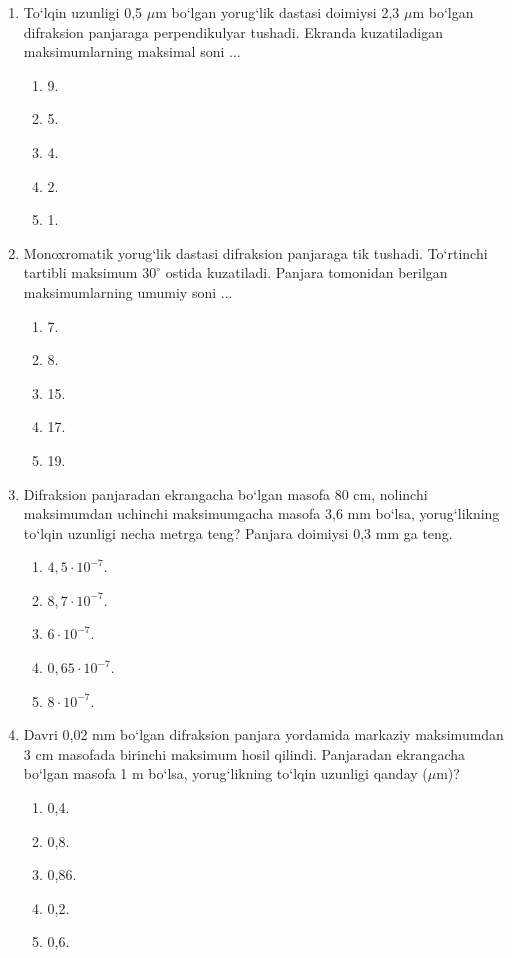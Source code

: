 \begin{enumerate}
\item To‘lqin uzunligi 0,5 $\mu$m bo‘lgan yorug‘lik dastasi doimiysi 2,3 $\mu$m bo‘lgan difraksion panjaraga perpendikulyar tushadi. Ekranda kuzatiladigan maksimumlarning maksimal soni ...
\begin{enumerate}[label=\Alph*)]
\item 9.
\item 5.
\item 4.
\item 2.
\item 1.
\end{enumerate}

\item Monoxromatik yorug‘lik dastasi difraksion panjaraga tik tushadi. To‘rtinchi tartibli maksimum $30^\circ$ ostida kuzatiladi. Panjara tomonidan berilgan maksimumlarning umumiy soni ...
\begin{enumerate}[label=\Alph*)]
\item 7.
\item 8.
\item 15.
\item 17.
\item 19.
\end{enumerate}

\item Difraksion panjaradan ekrangacha bo‘lgan masofa 80 cm, nolinchi maksimumdan uchinchi maksimumgacha masofa 3,6 mm bo‘lsa, yorug‘likning to‘lqin uzunligi necha metrga teng? Panjara doimiysi 0,3 mm ga teng.
\begin{enumerate}[label=\Alph*)]
\item $4{,}5\cdot10^{-7}$.
\item $8{,}7\cdot10^{-7}$.
\item $6\cdot10^{-7}$.
\item $0{,}65\cdot10^{-7}$.
\item $8\cdot10^{-7}$.
\end{enumerate}

\item Davri 0,02 mm bo‘lgan difraksion panjara yordamida markaziy maksimumdan 3 cm masofada birinchi maksimum hosil qilindi. Panjaradan ekrangacha bo‘lgan masofa 1 m bo‘lsa, yorug‘likning to‘lqin uzunligi qanday ($\mu$m)?
\begin{enumerate}[label=\Alph*)]
\item 0,4.
\item 0,8.
\item 0,86.
\item 0,2.
\item 0,6.
\end{enumerate}


\end{enumerate}
